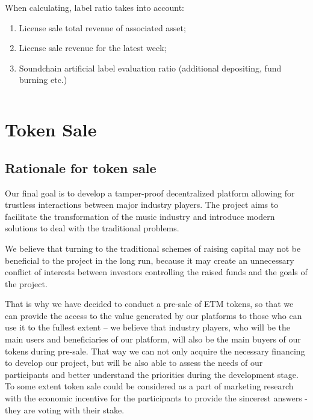 \documentclass[12pt]{report}
\begin{document}
When calculating, label ratio takes into account:
\begin{enumerate}
	\item License sale total revenue of associated asset;
	\item License sale revenue for the latest week;
	\item Soundchain artificial label evaluation ratio (additional depositing, fund burning etc.)
\end{enumerate}
\begin{equation}
\end{equation}



\chapter{Token Sale}
\label{tokensale}

\section{Rationale for token sale}
\label{tokensale-rationale}
Our final goal is to develop a tamper-proof decentralized platform allowing for trustless interactions between major industry players. The project aims to facilitate the transformation of the music industry and introduce modern solutions to deal with the traditional problems.
 
We believe that turning to the traditional schemes of raising capital may not be beneficial to the project in the long run, because it may create an unnecessary conflict of interests between investors controlling the raised funds and the goals of the project.
 
That is why we have decided to conduct a pre-sale of ETM tokens, so that we can provide the access to the value generated by our platforms to those who can use it to the fullest extent – we believe that industry players, who will be the main users and beneficiaries of our platform, will also be the main buyers of our tokens during pre-sale. That way we can not only acquire the necessary financing to develop our project, but will be also able to assess the needs of our participants and better understand the priorities during the development stage. To some extent token sale could be considered as a part of marketing research with the economic incentive for the participants to provide the sincerest answers - they are voting with their stake.
\end{document}
